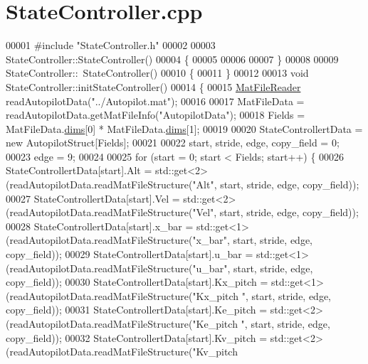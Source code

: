 \hypertarget{_state_controller_8cpp_source}{}\section{State\+Controller.\+cpp}
\label{_state_controller_8cpp_source}

\begin{DoxyCode}
00001 \textcolor{preprocessor}{#include "StateController.h"}
00002 
00003 StateController::StateController()
00004 \{
00005     
00006     
00007 \}
00008 
00009 StateController::~StateController()
00010 \{
00011 \}
00012 
00013 \textcolor{keywordtype}{void} StateController::initStateController()
00014 \{
00015     \hyperlink{class_mat_file_reader}{MatFileReader} readAutopilotData(\textcolor{stringliteral}{"../Autopilot.mat"});
00016 
00017     MatFileData = readAutopilotData.getMatFileInfo(\textcolor{stringliteral}{"AutopilotData"});
00018     Fields = MatFileData.\hyperlink{group___m_a_t_a8e01234e1c862ce3472bb37f5a09b92c}{dims}[0] * MatFileData.\hyperlink{group___m_a_t_a8e01234e1c862ce3472bb37f5a09b92c}{dims}[1];
00019 
00020     StateControllertData = \textcolor{keyword}{new} AutopilotStruct[Fields];
00021 
00022     start, stride, edge, copy\_field = 0;
00023     edge = 9;
00024 
00025     \textcolor{keywordflow}{for} (start = 0; start < Fields; start++) \{
00026         StateControllertData[start].Alt = std::get<2>(readAutopilotData.readMatFileStructure(\textcolor{stringliteral}{"Alt"}, start, 
      stride, edge, copy\_field));
00027         StateControllertData[start].Vel = std::get<2>(readAutopilotData.readMatFileStructure(\textcolor{stringliteral}{"Vel"}, start, 
      stride, edge, copy\_field));
00028         StateControllertData[start].x\_bar = std::get<1>(readAutopilotData.readMatFileStructure(\textcolor{stringliteral}{"x\_bar"}, 
      start, stride, edge, copy\_field));
00029         StateControllertData[start].u\_bar = std::get<1>(readAutopilotData.readMatFileStructure(\textcolor{stringliteral}{"u\_bar"}, 
      start, stride, edge, copy\_field));
00030         StateControllertData[start].Kx\_pitch = std::get<1>(readAutopilotData.readMatFileStructure(\textcolor{stringliteral}{"Kx\_pitch
      "}, start, stride, edge, copy\_field));
00031         StateControllertData[start].Ke\_pitch = std::get<2>(readAutopilotData.readMatFileStructure(\textcolor{stringliteral}{"Ke\_pitch
      "}, start, stride, edge, copy\_field));
00032         StateControllertData[start].Kv\_pitch = std::get<2>(readAutopilotData.readMatFileStructure(\textcolor{stringliteral}{"Kv\_pitch
}
\end{DoxyCode}
